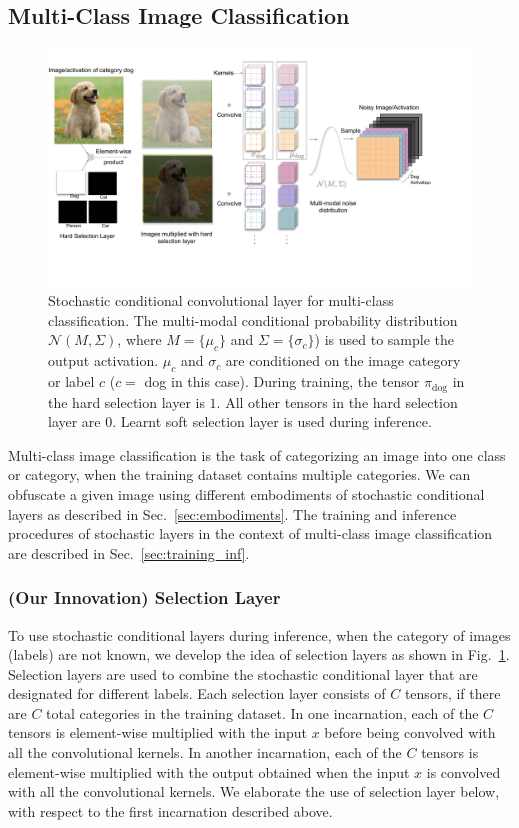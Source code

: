 \documentclass[12pt, letterpaper]{article}
\begin{document}
\subsection{Multi-Class Image Classification}
\label{sec:classification}
\begin{figure}[h!]
    \centering
    \includegraphics[width=\textwidth, trim={0cm 2cm 2.4cm 0.5cm}, clip]{Classification Conditional noise layer.pdf}
    \caption{Stochastic conditional convolutional layer for multi-class classification. The multi-modal conditional probability distribution $\mathcal{N}(M, \Sigma)$, where $M=\{\mu_c\}$ and $\Sigma=\{\sigma_c\}$) is used to sample the output activation. $\mu_c$ and $\sigma_c$ are conditioned on the image category or label $c$ ($c=$ dog in this case). During training, the tensor $\pi_\mathrm{dog}$ in the hard selection layer is $1$. All other tensors in the hard selection layer are $0$. Learnt soft selection layer is used during inference.}
    \label{fig:classification}
\end{figure}
Multi-class image classification is the task of categorizing an image into one class or category, when the training dataset contains multiple categories. We can obfuscate a given image using different embodiments of stochastic conditional layers as described in Sec.~\ref{sec:embodiments}. 
The training and inference procedures of stochastic layers in the context of multi-class image classification are described in Sec.~\ref{sec:training_inf}.

\subsubsection{(Our Innovation) Selection Layer}
To use stochastic conditional layers during inference, when the category of images (labels) are not known, we develop the idea of selection layers as shown in Fig.~\ref{fig:classification}. Selection layers are used to combine the stochastic conditional layer that are designated for different labels. Each selection layer consists of $C$ tensors, if there are $C$ total categories in the training dataset.
In one incarnation, each of the $C$ tensors is element-wise multiplied with the input $x$ before being convolved with all the convolutional kernels. In another incarnation, each of the $C$ tensors is element-wise multiplied with the output obtained when the input $x$ is convolved with all the convolutional kernels. We elaborate the use of selection layer below, with respect to the first incarnation described above.
\end{document}

